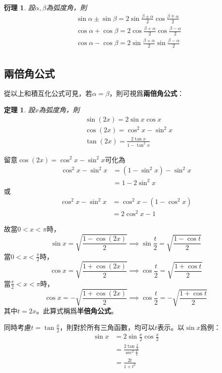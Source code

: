 \documentclass[12pt]{article}
\newtheorem*{theorem}{定理}
\newtheorem*{corollary}{衍理}
\begin{document}
    \begin{corollary}
        設$\alpha,\beta$為弧度角，則\begin{align*}
            &\sin{\alpha}\pm\sin{\beta}=2\sin{\frac{\beta\pm\alpha}{2}}\cos{\frac{\beta\mp\alpha}{2}}\\
            &\cos{\alpha}+\cos{\beta}=2\cos{\frac{\beta+\alpha}{2}}\cos{\frac{\beta-\alpha}{2}}\\
            &\cos{\alpha}-\cos{\beta}=2\sin{\frac{\beta+\alpha}{2}}\sin{\frac{\beta-\alpha}{2}}\\
        \end{align*}
    \end{corollary}

    \subsection*{兩倍角公式}

    從以上和積互化公式可見，若$\alpha=\beta$，則可視爲\textbf{兩倍角公式}：

    \begin{theorem}
        設$x$為弧度角，則\begin{align*}
            &\sin(2x)=2\sin{x}\cos{x}\\
            &\cos(2x)=\cos^2{x}-\sin^2{x}\\
            &\tan(2x)=\frac{2\tan{x}}{1-\tan^2{x}}
        \end{align*}
    \end{theorem}

    留意$\cos(2x)=\cos^2{x}-\sin^2{x}$可化為\begin{align*}
        \cos^2{x}-\sin^2{x}&=(1-\sin^2{x})-\sin^2{x}\\
        &=1-2\sin^2{x}
    \end{align*}
    或\begin{align*}
        \cos^2{x}-\sin^2{x}&=\cos^2{x}-(1-\cos^2{x})\\
        &=2\cos^2{x}-1
    \end{align*}

    故當$0<x<\pi$時，$$\sin{x}=\sqrt{\frac{1-\cos(2x)}{2}}\implies\sin{\frac{t}{2}}=\sqrt{\frac{1-\cos{t}}{2}}$$
    當$0<x<\frac{\pi}{2}$時，$$\cos{x}=\sqrt{\frac{1+\cos(2x)}{2}}\implies\cos{\frac{t}{2}}=\sqrt{\frac{1+\cos{t}}{2}}$$
    當$\frac{\pi}{2}<x<\pi$時，$$\cos{x}=-\sqrt{\frac{1+\cos(2x)}{2}}\implies\cos{\frac{t}{2}}=-\sqrt{\frac{1+\cos{t}}{2}}$$
    其中$t=2x$。此算式稱爲\textbf{半倍角公式}。

    同時考慮$t=\tan{\frac{x}{2}}$，則對於所有三角函數，均可以$t$表示。以$\sin{x}$爲例：\begin{align*}
        \sin{x}&=2\sin{\frac{x}{2}}\cos{\frac{x}{2}}\\
        &=\frac{2\tan{\frac{x}{2}}}{\sec^2{\frac{x}{2}}}\\
        &=\frac{2t}{1+t^2}
    \end{align*}
\end{document}
